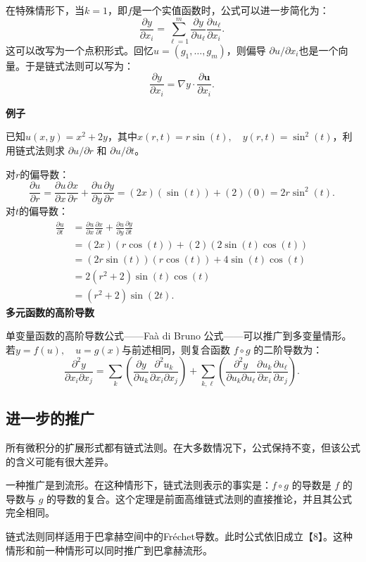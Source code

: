 在特殊情形下，当$k = 1$，即$f$是一个实值函数时，公式可以进一步简化为：
$$
\frac{\partial y}{\partial x_i} 
= \sum_{\ell=1}^m \frac{\partial y}{\partial u_\ell} \frac{\partial u_\ell}{\partial x_i}.~
$$
这可以改写为一个点积形式。回忆$u = (g_1, \dots, g_m)$，则偏导 $\partial u / \partial x_i$也是一个向量。于是链式法则可以写为：
$$
\frac{\partial y}{\partial x_i} = \nabla y \cdot \frac{\partial \mathbf{u}}{\partial x_i}.~
$$

\textbf{例子}

已知$u(x, y) = x^2 + 2y$，其中$x(r, t) = r \sin(t), \quad y(r, t) = \sin^2(t)$，利用链式法则求 $\partial u/\partial r$ 和 $\partial u/\partial t$。

对$r$的偏导数：
$$
\frac{\partial u}{\partial r} 
= \frac{\partial u}{\partial x}\frac{\partial x}{\partial r} + \frac{\partial u}{\partial y}\frac{\partial y}{\partial r}
= (2x)(\sin(t)) + (2)(0)
= 2r\sin^2(t).~
$$
对$t$的偏导数：
$$
\begin{aligned}
\frac{\partial u}{\partial t} 
&= \frac{\partial u}{\partial x}\frac{\partial x}{\partial t} + \frac{\partial u}{\partial y}\frac{\partial y}{\partial t} \\
&= (2x)(r\cos(t)) + (2)(2\sin(t)\cos(t)) \\
&= (2r\sin(t))(r\cos(t)) + 4\sin(t)\cos(t) \\
&= 2(r^2+2)\sin(t)\cos(t) \\
&= (r^2+2)\sin(2t).
\end{aligned}~
$$
\textbf{多元函数的高阶导数}

单变量函数的高阶导数公式——Faà di Bruno 公式——可以推广到多变量情形。若$y = f(u), \quad u = g(x)$与前述相同，则复合函数 $f \circ g$ 的二阶导数为：
$$
\frac{\partial^2 y}{\partial x_i \partial x_j}
= \sum_{k} \left( \frac{\partial y}{\partial u_k} \frac{\partial^2 u_k}{\partial x_i \partial x_j} \right)
+ \sum_{k,\ell} \left( \frac{\partial^2 y}{\partial u_k \partial u_\ell} \frac{\partial u_k}{\partial x_i} \frac{\partial u_\ell}{\partial x_j} \right).~
$$
\subsection{进一步的推广}
所有微积分的扩展形式都有链式法则。在大多数情况下，公式保持不变，但该公式的含义可能有很大差异。

一种推广是到流形。在这种情形下，链式法则表示的事实是：$f \circ g$ 的导数是 $f$ 的导数与 $g$ 的导数的复合。这个定理是前面高维链式法则的直接推论，并且其公式完全相同。

链式法则同样适用于巴拿赫空间中的Fréchet导数。此时公式依旧成立【8】。这种情形和前一种情形可以同时推广到巴拿赫流形。

